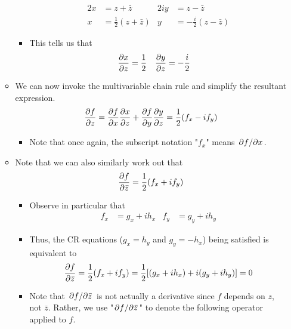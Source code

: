 \documentclass[../notes.tex]{subfiles}
\begin{document}
\begin{itemize}
\begin{itemize}
\begin{itemize}
            \begin{align*}
                2x &= z+\bar{z}&
                    2iy &= z-\bar{z}\\
                x &= \frac{1}{2}(z+\bar{z})&
                    y &= -\frac{i}{2}(z-\bar{z})
            \end{align*}
            \item This tells us that
            \begin{align*}
                \pdv{x}{z} &= \frac{1}{2}&
                \pdv{y}{z} &= -\frac{i}{2}
            \end{align*}
        \end{itemize}
        \item We can now invoke the multivariable chain rule and simplify the resultant expression.
        \begin{equation*}
            \pdv{f}{z} = \pdv{f}{x}\pdv{x}{z}+\pdv{f}{y}\pdv{y}{z}
            = \frac{1}{2}(f_x-if_y)
        \end{equation*}
        \begin{itemize}
            \item Note that once again, the subscript notation "$f_x$" means $\pdv*{f}{x}$.
        \end{itemize}
        \item Note that we can also similarly work out that
        \begin{equation*}
            \pdv{f}{\bar{z}} = \frac{1}{2}(f_x+if_y)
        \end{equation*}
        \begin{itemize}
            \item Observe in particular that
            \begin{align*}
                f_x &= g_x+ih_x&
                f_y &= g_y+ih_y
            \end{align*}
            \item Thus, the CR equations ($g_x=h_y$ and $g_y=-h_x$) being satisfied is equivalent to
            \begin{equation*}
                \pdv{f}{\bar{z}} = \frac{1}{2}(f_x+if_y)
                = \frac{1}{2}[(g_x+ih_x)+i(g_y+ih_y)]
                = 0
            \end{equation*}
            \item Note that $\pdv*{f}{\bar{z}}$ is not actually a derivative since $f$ depends on $z$, not $\bar{z}$. Rather, we use "$\pdv*{f}{\bar{z}}$" to denote the following operator applied to $f$.

\end{itemize}
\end{itemize}
\end{itemize}
\end{document}
